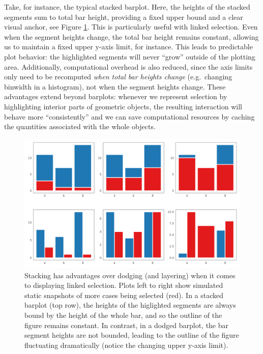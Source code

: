 \documentclass[
]{book}
\theoremstyle{definition}
\theoremstyle{definition}
\theoremstyle{definition}
\theoremstyle{definition}
\theoremstyle{remark}
\begin{document}
Take, for instance, the typical stacked barplot. Here, the heights of the stacked segments sum to total bar height, providing a fixed upper bound and a clear visual anchor, see Figure \ref{fig:stacking-vs-dodging}. This is particularly useful with linked selection. Even when the segment heights change, the total bar height remains constant, allowing us to maintain a fixed upper y-axis limit, for instance. This leads to predictable plot behavior: the highlighted segments will never ``grow'' outside of the plotting area. Additionally, computational overhead is also reduced, since the axis limits only need to be recomputed \emph{when total bar heights change} (e.g.~changing binwidth in a histogram), not when the segment heights change. These advantages extend beyond barplots: whenever we represent selection by highlighting interior parts of geometric objects, the resulting interaction will behave more ``consistently'' and we can save computational resources by caching the quantities associated with the whole objects.

\begin{figure}

{\centering \includegraphics[width=1\linewidth,height=1\textheight]{./figures/stacking-vs-dodging} 

}

\caption{Stacking has advantages over dodging (and layering) when it comes to displaying linked selection. Plots left to right show simulated static snapshots of more cases being selected (red). In a stacked barplot (top row), the heights of the higlighted segments are always bound by the height of the whole bar, and so the outline of the figure remains constant. In contrast, in a dodged barplot, the bar segment heights are not bounded, leading to the outline of the figure fluctuating dramatically (notice the changing upper y-axis limit).}\label{fig:stacking-vs-dodging}
\end{figure}
\end{document}
